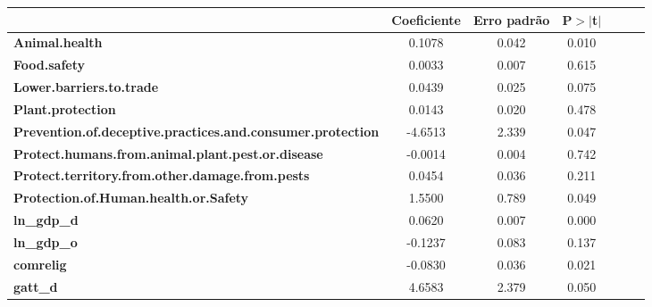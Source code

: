 \begin{center}
\begin{tabular}{lcccccc}
                                                                   & \textbf{Coeficiente} & \textbf{Erro padrão} &\textbf{P$> |$t$|$}\\
\midrule
\textbf{Animal.health}                                             &       0.1078  &        0.042     &        0.010\\
\textbf{Food.safety}                                               &       0.0033  &        0.007     &        0.615\\
\textbf{Lower.barriers.to.trade}                                   &       0.0439  &        0.025     &        0.075\\
\textbf{Plant.protection}                                          &       0.0143  &        0.020     &        0.478\\
\textbf{Prevention.of.deceptive.practices.and.consumer.protection} &      -4.6513  &        2.339     &        0.047\\
\textbf{Protect.humans.from.animal.plant.pest.or.disease}          &      -0.0014  &        0.004     &        0.742\\
\textbf{Protect.territory.from.other.damage.from.pests}            &       0.0454  &        0.036     &        0.211\\
\textbf{Protection.of.Human.health.or.Safety}                      &       1.5500  &        0.789     &        0.049\\
\textbf{ln\_gdp\_d}                                                &       0.0620  &        0.007     &        0.000\\
\textbf{ln\_gdp\_o}                                                &      -0.1237  &        0.083     &        0.137\\
\textbf{comrelig}                                                  &      -0.0830  &        0.036     &        0.021\\
\textbf{gatt\_d}                                                   &       4.6583  &        2.379     &        0.050\\
\bottomrule
\end{tabular}
\end{center}